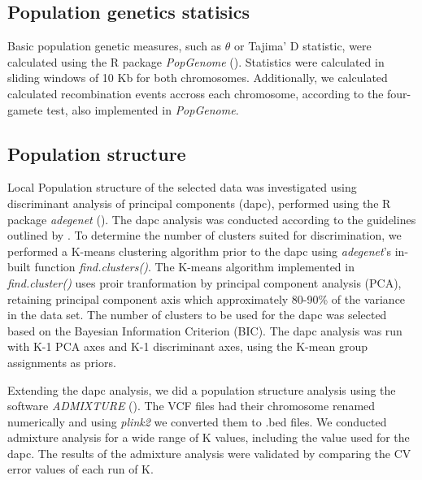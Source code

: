 \documentclass[11pt]{article}
\begin{document}
\subsection*{Population genetics statisics}
\label{sec:org0496f6d}
Basic population genetic measures, such as \(\theta\) or Tajima' D statistic, were calculated using the R package \emph{PopGenome} (\cite{pfeifer-2014-popgen}). Statistics were calculated in sliding windows of 10 Kb for both chromosomes. Additionally, we calculated calculated recombination events accross each chromosome, according to the four-gamete test, also implemented in \emph{PopGenome}.

\subsection*{Population structure}
\label{sec:org7f50f99}
Local Population structure of the selected data was investigated using discriminant analysis of principal components (dapc), performed using the R package \emph{adegenet} (\cite{jombart-2010-discr-analy}). The dapc analysis was conducted according to the guidelines outlined by \cite{thia-2022-guidel-stand}. To determine the number of clusters suited for discrimination, we performed a K-means clustering algorithm prior to the dapc using \emph{adegenet}'s in-built function \emph{find.clusters()}. The K-means algorithm implemented in \emph{find.cluster()} uses proir tranformation by principal component analysis (PCA), retaining principal component axis which approximately 80-90\% of the variance in the data set. The number of clusters to be used for the dapc was selected based on the Bayesian Information Criterion (BIC). The dapc analysis was run with K-1 PCA axes and K-1 discriminant axes, using the K-mean group assignments as priors.

Extending the dapc analysis, we did a population structure analysis using the software \emph{ADMIXTURE} (\cite{alexander-2009-fast-model}). The VCF files had their chromosome renamed numerically and using \emph{plink2} we converted them to .bed files. We conducted admixture analysis for a wide range of K values, including the value used for the dapc. The results of the admixture analysis were validated by comparing the CV error values of each run of K.
\end{document}
